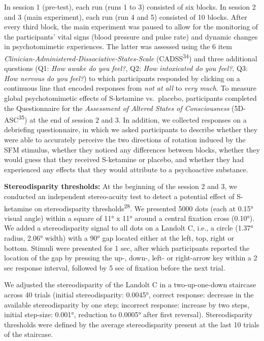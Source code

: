 \documentclass[
]{article}
\begin{document}
In session 1 (pre-test), each run (runs 1 to 3) consisted of six blocks.
In session 2 and 3 (main experiment), each run (run 4 and 5) consisted
of 10 blocks. After every third block, the main experiment was paused to
allow for the monitoring of the participants' vital signs (blood
pressure and pulse rate) and dynamic changes in psychotomimetic
experiences. The latter was assessed using the 6 item
\emph{Clinician-Administered-Dissociative-States-Scale}
(CADSS\textsuperscript{34}) and three additional questions (Q1:
\emph{How awake do you feel?}, Q2: \emph{How intoxicated do you feel?},
Q3: \emph{How nervous do you feel?}) to which participants responded by
clicking on a continuous line that encoded responses from \emph{not at
all} to \emph{very much}. To measure global psychotomimetic effects of
S-ketamine vs.~placebo, participants completed the Questionnaire for the
\emph{Assessment of Altered States of Consciousness}
(5D-ASC\textsuperscript{35}) at the end of session 2 and 3. In addition,
we collected responses on a debriefing questionnaire, in which we asked
participants to describe whether they were able to accurately perceive
the two directions of rotation induced by the SFM stimulus, whether they
noticed any differences between blocks, whether they would guess that
they received S-ketamine or placebo, and whether they had experienced
any effects that they would attribute to a psychoactive substance.

\textbf{Stereodisparity thresholds:} At the beginning of the session 2
and 3, we conducted an independent stereo-acuity test to detect a
potential effect of S-ketamine on stereodisparity
thresholds\textsuperscript{28}. We presented 5000 dots (each at 0.15°
visual angle) within a square of 11° x 11° around a central fixation
cross (0.10°). We added a stereodisparity signal to all dots on a
Landolt C, i.e., a circle (1.37° radius, 2.06° width) with a 90° gap
located either at the left, top, right or bottom. Stimuli were presented
for 1 sec, after which participants reported the location of the gap by
pressing the up-, down-, left- or right-arrow key within a 2 sec
response interval, followed by 5 sec of fixation before the next trial.

We adjusted the stereodisparity of the Landolt C in a two-up-one-down
staircase across 40 trials (initial stereodisparity: 0.0045°, correct
response: decrease in the available stereodisparity by one step;
incorrect response: increase by two steps, initial step-size: 0.001°,
reduction to 0.0005° after first reversal). Stereodisparity thresholds
were defined by the average stereodisparity present at the last 10
trials of the staircase.
\end{document}
